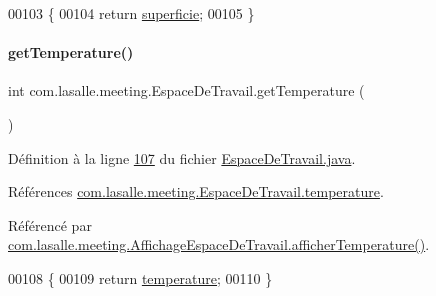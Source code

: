 \begin{DoxyCode}
00103     \{
00104         \textcolor{keywordflow}{return} \hyperlink{classcom_1_1lasalle_1_1meeting_1_1_espace_de_travail_a3a5b9c42fa29930b092154e1bd0e4c10}{superficie};
00105     \}
\end{DoxyCode}
\mbox{\label{classcom_1_1lasalle_1_1meeting_1_1_espace_de_travail_a4c01c37fa6431d48c59274aaa00fdbe3}} 
\paragraph{\texorpdfstring{get\+Temperature()}{getTemperature()}}
{\footnotesize\ttfamily int com.\+lasalle.\+meeting.\+Espace\+De\+Travail.\+get\+Temperature (\begin{DoxyParamCaption}{ }\end{DoxyParamCaption})}



Définition à la ligne \hyperlink{_espace_de_travail_8java_source_l00107}{107} du fichier \hyperlink{_espace_de_travail_8java_source}{Espace\+De\+Travail.\+java}.



Références \hyperlink{_espace_de_travail_8java_source_l00036}{com.\+lasalle.\+meeting.\+Espace\+De\+Travail.\+temperature}.



Référencé par \hyperlink{_affichage_espace_de_travail_8java_source_l00105}{com.\+lasalle.\+meeting.\+Affichage\+Espace\+De\+Travail.\+afficher\+Temperature()}.


\begin{DoxyCode}
00108     \{
00109         \textcolor{keywordflow}{return} \hyperlink{classcom_1_1lasalle_1_1meeting_1_1_espace_de_travail_ad5349fa46af27855755ce6cee644a6e2}{temperature};
00110     \}
\end{DoxyCode}
\mbox{\label{classcom_1_1lasalle_1_1meeting_1_1_espace_de_travail_affce017a0a5ba338d7b0b7f6bbce6c68}} 
